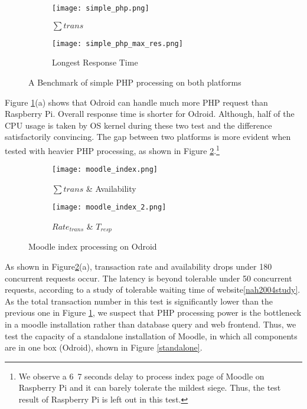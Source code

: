 \begin{figure}[h]
\centering
\begin{subfigure}{0.45\textwidth}
\centering
\texttt{[image: simple\_php.png]}
\caption{$\sum trans$}
\end{subfigure}
\begin{subfigure}{0.45\textwidth}
\centering
\texttt{[image: simple\_php\_max\_res.png]}
\caption{Longest Response Time}
\end{subfigure}
\caption{A Benchmark of simple PHP processing on both platforms}
\label{simple_php}
\end{figure}

Figure \ref{simple_php}(a) shows that Odroid can handle much more PHP request than Raspberry Pi. Overall response time is shorter for Odroid. Although, half of the CPU usage is taken by OS kernel during these two test and the difference satisfactorily convincing. The gap between two platforms is more evident when tested with heavier PHP processing, as shown in Figure \ref{moodle_php_result}.\footnote{We observe a 6~7 seconds delay to process index page of Moodle on Raspberry Pi and it can barely tolerate the mildest siege. Thus, the test result of Raspberry Pi is left out in this test.}

\begin{figure}[h]
\centering
\begin{subfigure}{0.45\textwidth}
\centering
\texttt{[image: moodle\_index.png]}
\caption{$\sum trans$ \& Availability}
\end{subfigure}
\begin{subfigure}{0.45\textwidth}
\centering
\texttt{[image: moodle\_index\_2.png]}
\caption{$Rate_{trans}$ \& $T_{resp}$}
\end{subfigure}
\caption{Moodle index processing on Odroid}
\label{moodle_php_result}
\end{figure}

As shown in Figure\ref{moodle_php_result}(a), transaction rate and availability drops under 180 concurrent requests occur. The latency is beyond tolerable under 50 concurrent requests, according to a study of tolerable waiting time of website\ref{nah2004study}. As the total transaction number in this test is significantly lower than the previous one in Figure \ref{simple_php}, we suspect that PHP processing power is the bottleneck in a moodle installation rather than database query and web frontend. Thus, we test the capacity of a standalone installation of Moodle, in which all components are in one box (Odroid), shown in Figure \ref{standalone}.

